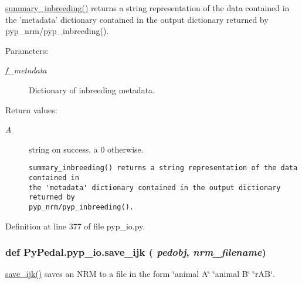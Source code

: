\hyperlink{namespacePyPedal_1_1pyp__io_3f2dc00cc32ac2b15474f5dbca14adf5}{summary\_\-inbreeding()} returns a string representation of the data contained in the 'metadata' dictionary contained in the output dictionary returned by pyp\_\-nrm/pyp\_\-inbreeding(). 

\begin{Desc}
\item[Parameters:]
\begin{description}
\item[{\em f\_\-metadata}]Dictionary of inbreeding metadata. \end{description}
\end{Desc}
\begin{Desc}
\item[Return values:]
\begin{description}
\item[{\em A}]string on success, a 0 otherwise.

\footnotesize\begin{verbatim}summary_inbreeding() returns a string representation of the data contained in
the 'metadata' dictionary contained in the output dictionary returned by
pyp_nrm/pyp_inbreeding().
\end{verbatim}
\normalsize
 \end{description}
\end{Desc}


Definition at line 377 of file pyp\_\-io.py.\hypertarget{namespacePyPedal_1_1pyp__io_a38cc3a00942050095dd82a9f1bc7a29}{
\subsubsection[save\_\-ijk]{\setlength{\rightskip}{0pt plus 5cm}def Py\-Pedal.pyp\_\-io.save\_\-ijk ( {\em pedobj},  {\em nrm\_\-filename})}}
\label{namespacePyPedal_1_1pyp__io_a38cc3a00942050095dd82a9f1bc7a29}


\hyperlink{namespacePyPedal_1_1pyp__io_a38cc3a00942050095dd82a9f1bc7a29}{save\_\-ijk()} saves an NRM to a file in the form \char`\"{}animal A\char`\"{} \char`\"{}animal B\char`\"{} \char`\"{}r\-AB\char`\"{}. 

